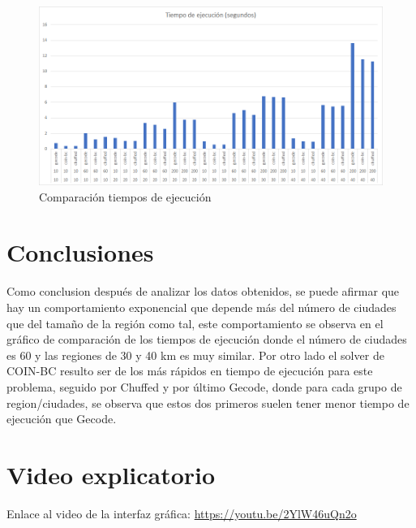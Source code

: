 \documentclass{article}
\begin{document}
\begin{figure}[h!]
    \centering
    \includegraphics[width=\linewidth]{"Comparacion tiempos de ejecucion.png"}
    \caption{Comparación tiempos de ejecución}
\end{figure}

\pagebreak

\section{Conclusiones}
Como conclusion después de analizar los datos obtenidos, se puede afirmar que hay un comportamiento exponencial que depende más del número de ciudades que
del tamaño de la región como tal, este comportamiento se observa en el gráfico de comparación de los tiempos de ejecución donde el número de ciudades es 60
y las regiones de 30 y 40 km es muy similar.
Por otro lado el solver de COIN-BC resulto ser de los más rápidos en tiempo de ejecución para este problema, seguido por Chuffed y por último Gecode,
donde para cada grupo de region/ciudades, se observa que estos dos primeros suelen tener menor tiempo de ejecución que Gecode.

\section{Video explicatorio}
Enlace al video de la interfaz gráfica: \url{https://youtu.be/2YlW46uQn2o}
\end{document}
